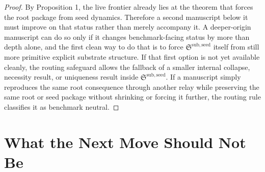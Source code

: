 \documentclass[11pt]{article}
\newcommand{\SeedPackage}{\mathfrak S^{\mathrm{sub,seed}}}
\begin{document}
\begin{proof}
By Proposition 1, the live frontier already lies at the theorem that forces the root package from seed dynamics. Therefore a second manuscript below it must improve on that status rather than merely accompany it. A deeper-origin manuscript can do so only if it changes benchmark-facing status by more than depth alone, and the first clean way to do that is to force \(\SeedPackage\) itself from still more primitive explicit substrate structure. If that first option is not yet available cleanly, the routing safeguard allows the fallback of a smaller internal collapse, necessity result, or uniqueness result inside \(\SeedPackage\). If a manuscript simply reproduces the same root consequence through another relay while preserving the same root or seed package without shrinking or forcing it further, the routing rule classifies it as benchmark neutral.
\end{proof}

\section{What the Next Move Should Not Be}
\end{document}
